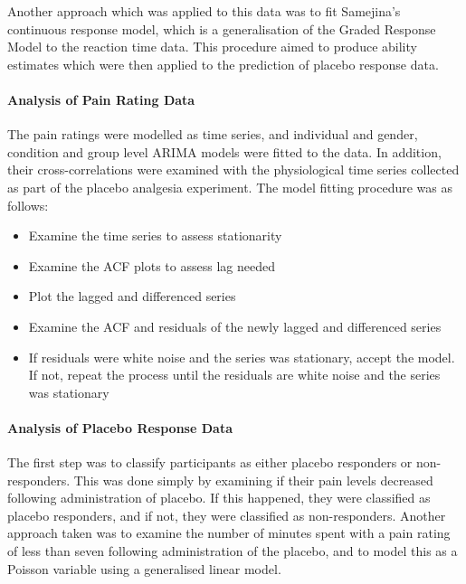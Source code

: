 Another approach which was applied to this data was to fit Samejina's continuous response model, which is a generalisation of the Graded Response Model %
to the reaction time data. This procedure aimed to produce ability estimates which were then applied to the prediction of placebo response data. 

\paragraph{Analysis of Pain Rating Data}
\label{sec:analysis-pain-rating}

The pain ratings were modelled as time series, and individual and gender, condition and group level ARIMA models were fitted to the data. In addition, their cross-correlations were examined with the physiological time series collected as part of the placebo analgesia experiment. The model fitting procedure was as follows:
\begin{itemize}
\item Examine the time series to assess stationarity

\item Examine the ACF plots to assess lag needed

\item Plot the lagged and differenced series


\item Examine the ACF and residuals of the newly lagged and differenced series

\item If residuals were white noise and the series was stationary, accept the model. If not, repeat the process until the residuals are white noise and the series was  stationary
\end{itemize}

\paragraph{Analysis of Placebo Response Data}
\label{sec:analys-plac-resp}

The first step was to classify participants as either placebo responders or non-responders. This was done simply by examining if their pain levels decreased following administration of placebo. If this happened, they were classified as placebo responders, and if not, they were classified as non-responders. Another approach taken was to examine the number of minutes spent with a pain rating of less than seven following administration of the placebo, and to model this as a Poisson variable using a generalised linear model. 

